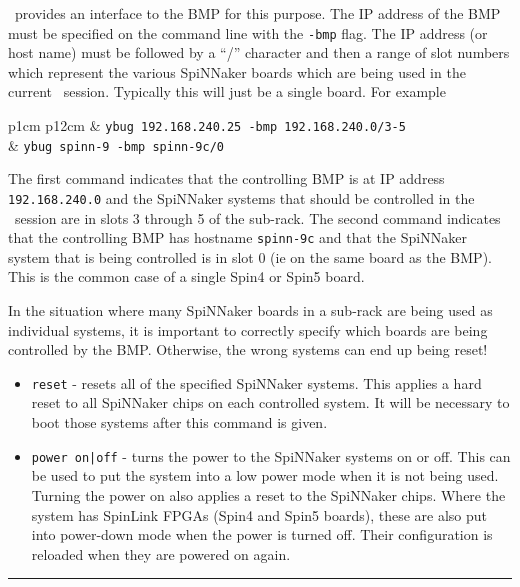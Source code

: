 \ybug\ provides an interface to the BMP for this purpose. The IP
address of the BMP must be specified on the command line with the
\texttt{-bmp} flag. The IP address (or host name) must be followed
by a ``/'' character and then a range of slot numbers which represent
the various SpiNNaker boards which are being used in the current
\ybug\ session. Typically this will just be a single board. For example

\begin{tabular}{p{1cm} p{12cm}}
& \texttt{ybug 192.168.240.25 -bmp 192.168.240.0/3-5} \\
& \texttt{ybug spinn-9 -bmp spinn-9c/0} \\
\end{tabular}

The first command indicates that the controlling BMP is at IP address
\texttt{192.168.240.0} and the SpiNNaker systems that should be
controlled in the \ybug\ session are in slots 3 through 5 of the
sub-rack. The second command indicates that the controlling BMP has
hostname \texttt{spinn-9c} and that the SpiNNaker system that is being
controlled is in slot 0 (ie on the same board as the BMP). This is the
common case of a single Spin4 or Spin5 board.

In the situation where many SpiNNaker boards in a sub-rack are being
used as individual systems, it is important to correctly specify which
boards are being controlled by the BMP. Otherwise, the wrong systems
can end up being reset!

\begin{itemize}

\item
\texttt{reset} - resets all of the specified SpiNNaker systems. This
applies a hard reset to all SpiNNaker chips on each controlled system.
It will be necessary to boot those systems after this command is
given.

\item
\texttt{power on|off} - turns the power to the SpiNNaker systems on
or off. This can be used to put the system into a low power mode when
it is not being used. Turning the power on also applies a reset to the
SpiNNaker chips. Where the system has SpinLink FPGAs (Spin4 and Spin5
boards), these are also put into power-down mode when the power is
turned off. Their configuration is reloaded when they are powered on
again.

\end{itemize}

\rule{\linewidth}{1pt}

